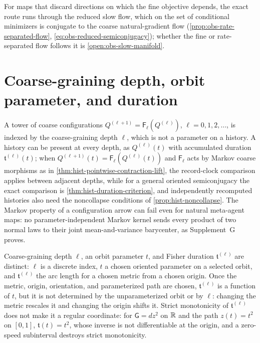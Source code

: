 For maps that discard directions on which the fine objective depends, the exact route
runs through the reduced slow flow, which on the set of conditional minimizers is
conjugate to the coarse natural-gradient flow (\cref{prop:obs-rate-separated-flow},
\eqref{eq:obs-reduced-semiconjugacy}); whether the fine or rate-separated flow follows
it is \cref{open:obs-slow-manifold}.

\section{Coarse-graining depth, orbit parameter, and duration}
\label{sec:hist-rg-depth-not-time}

A tower of coarse configurations $Q^{(\ell+1)}=\mathsf F_\ell(Q^{(\ell)})$,
$\ell=0,1,2,\ldots$, is indexed by the coarse-graining depth $\ell$, which is not a
parameter on a history.  A history can be present at every depth, as $Q^{(\ell)}(t)$
with accumulated duration $\mathfrak t^{(\ell)}(t)$; when
$Q^{(\ell+1)}(t)=\mathsf F_\ell(Q^{(\ell)}(t))$ and $\mathsf F_\ell$ acts by Markov coarse
morphisms as in \cref{thm:hist-pointwise-contraction-lift}, the record-clock comparison
applies between adjacent depths, while for a general oriented semiconjugacy the exact
comparison is \cref{thm:hist-duration-criterion}, and independently recomputed
histories also need the noncollapse conditions of \cref{prop:hist-noncollapse}.  The
Markov property of a configuration arrow can fail even for natural meta-agent maps:
no parameter-independent Markov kernel sends every product of two normal laws to
their joint mean-and-variance barycenter, as Supplement~G proves.

Coarse-graining depth $\ell$, an orbit parameter $t$, and Fisher duration
$\mathfrak t^{(\ell)}$ are distinct: $\ell$ is a discrete index, $t$ a chosen oriented
parameter on a selected orbit, and $\mathfrak t^{(\ell)}$ the arc length for a chosen
metric from a chosen origin.  Once the metric, origin, orientation, and parameterized path
are chosen, $\mathfrak t^{(\ell)}$ is a function of $t$, but it is not determined by the
unparameterized orbit or by $\ell$: changing the metric rescales it and changing the
origin shifts it.  Strict monotonicity of $\mathfrak t^{(\ell)}$ does not make it a
regular coordinate: for $\mathsf G=dz^2$ on $\mathbb R$ and the path $z(t)=t^2$ on $[0,1]$,
$\mathfrak t(t)=t^2$, whose inverse is not differentiable at the origin, and a zero-speed
subinterval destroys strict monotonicity.  

